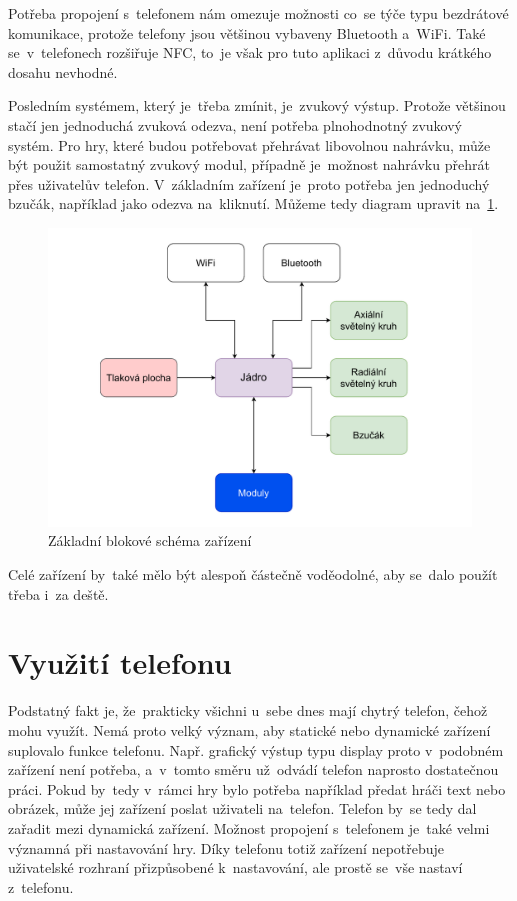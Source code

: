 Potřeba propojení s~telefonem nám omezuje možnosti co~se týče typu bezdrátové komunikace, protože telefony jsou většinou vybaveny Bluetooth a~WiFi.
Také se~v~telefonech rozšiřuje NFC, to~je však pro tuto aplikaci z~důvodu krátkého dosahu nevhodné.

Posledním systémem, který je~třeba zmínit, je~zvukový výstup.
Protože většinou stačí jen jednoduchá zvuková odezva, není potřeba plnohodnotný zvukový systém.
Pro hry, které budou potřebovat přehrávat libovolnou nahrávku, může být použit samostatný zvukový modul, případně je~možnost nahrávku přehrát přes uživatelův telefon.
V~základním zařízení je~proto potřeba jen jednoduchý bzučák, například jako odezva na~kliknutí.
Můžeme tedy diagram upravit na~\ref{fig:diagram_zanoreni_1}.
\begin{figure}[h]
    \centering
    \includegraphics[width=\textwidth]{text/TeoretickyUvod/AplikaceHernichZarizeni/diagram/zanoreni_1.pdf}
    \caption{Základní blokové schéma zařízení}
    \label{fig:diagram_zanoreni_1}
\end{figure}

Celé zařízení by~také mělo být alespoň částečně voděodolné, aby se~dalo použít třeba i~za deště.

\section{Využití telefonu \label{VyuzitiTelefonu}}
Podstatný fakt je, že~prakticky všichni u~sebe dnes mají chytrý telefon, čehož mohu využít.
Nemá proto velký význam, aby statické nebo dynamické zařízení suplovalo funkce telefonu.
Např. grafický výstup typu display proto v~podobném zařízení není potřeba, a~v~tomto směru už~odvádí telefon naprosto dostatečnou práci.
Pokud by~tedy v~rámci hry bylo potřeba například předat hráči text nebo obrázek, může jej zařízení poslat uživateli na~telefon.
Telefon by~se tedy dal zařadit mezi dynamická zařízení.
Možnost propojení s~telefonem je~také velmi významná při nastavování hry.
Díky telefonu totiž zařízení nepotřebuje uživatelské rozhraní přizpůsobené k~nastavování, ale prostě se~vše nastaví z~telefonu.

